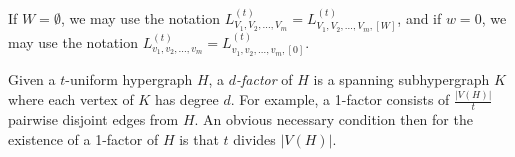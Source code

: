 If $W = \emptyset$, we may use the notation $L_{V_1, V_2, \ldots, V_m}^{(t)} = L_{V_1, V_2, \ldots, V_m, [W]}^{(t)}$, and if $w = 0$, we may use the notation $L_{v_1, v_2, \ldots, v_m}^{(t)} = L_{v_1, v_2, \ldots, v_m, [0]}^{(t)}$.


Given a $t$-uniform hypergraph $H$, a {\em $d$-factor} of $H$ is a spanning
subhypergraph $K$ where each vertex of $K$ has degree $d$. For example, a
1-factor consists of $\frac{|V(H)|}{t}$ pairwise disjoint edges from $H$. An
obvious necessary condition then for the existence of a 1-factor of $H$ is that
$t$ divides $|V(H)|$.
